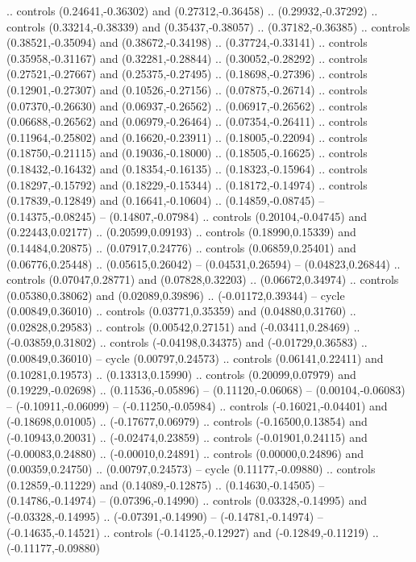 {{.. controls (0.24641,-0.36302) and (0.27312,-0.36458) .. (0.29932,-0.37292)
.. controls (0.33214,-0.38339) and (0.35437,-0.38057) .. (0.37182,-0.36385)
.. controls (0.38521,-0.35094) and (0.38672,-0.34198) .. (0.37724,-0.33141)
.. controls (0.35958,-0.31167) and (0.32281,-0.28844) .. (0.30052,-0.28292)
.. controls (0.27521,-0.27667) and (0.25375,-0.27495) .. (0.18698,-0.27396)
.. controls (0.12901,-0.27307) and (0.10526,-0.27156) .. (0.07875,-0.26714)
.. controls (0.07370,-0.26630) and (0.06937,-0.26562) .. (0.06917,-0.26562)
.. controls (0.06688,-0.26562) and (0.06979,-0.26464) .. (0.07354,-0.26411)
.. controls (0.11964,-0.25802) and (0.16620,-0.23911) .. (0.18005,-0.22094)
.. controls (0.18750,-0.21115) and (0.19036,-0.18000) .. (0.18505,-0.16625)
.. controls (0.18432,-0.16432) and (0.18354,-0.16135) .. (0.18323,-0.15964)
.. controls (0.18297,-0.15792) and (0.18229,-0.15344) .. (0.18172,-0.14974)
.. controls (0.17839,-0.12849) and (0.16641,-0.10604) .. (0.14859,-0.08745)
-- (0.14375,-0.08245)
-- (0.14807,-0.07984)
.. controls (0.20104,-0.04745) and (0.22443,0.02177) .. (0.20599,0.09193)
.. controls (0.18990,0.15339) and (0.14484,0.20875) .. (0.07917,0.24776)
.. controls (0.06859,0.25401) and (0.06776,0.25448) .. (0.05615,0.26042)
-- (0.04531,0.26594)
-- (0.04823,0.26844)
.. controls (0.07047,0.28771) and (0.07828,0.32203) .. (0.06672,0.34974)
.. controls (0.05380,0.38062) and (0.02089,0.39896) .. (-0.01172,0.39344)
-- cycle
(0.00849,0.36010)
.. controls (0.03771,0.35359) and (0.04880,0.31760) .. (0.02828,0.29583)
.. controls (0.00542,0.27151) and (-0.03411,0.28469) .. (-0.03859,0.31802)
.. controls (-0.04198,0.34375) and (-0.01729,0.36583) .. (0.00849,0.36010)
-- cycle
(0.00797,0.24573)
.. controls (0.06141,0.22411) and (0.10281,0.19573) .. (0.13313,0.15990)
.. controls (0.20099,0.07979) and (0.19229,-0.02698) .. (0.11536,-0.05896)
-- (0.11120,-0.06068)
-- (0.00104,-0.06083)
-- (-0.10911,-0.06099)
-- (-0.11250,-0.05984)
.. controls (-0.16021,-0.04401) and (-0.18698,0.01005) .. (-0.17677,0.06979)
.. controls (-0.16500,0.13854) and (-0.10943,0.20031) .. (-0.02474,0.23859)
.. controls (-0.01901,0.24115) and (-0.00083,0.24880) .. (-0.00010,0.24891)
.. controls (0.00000,0.24896) and (0.00359,0.24750) .. (0.00797,0.24573)
-- cycle
(0.11177,-0.09880)
.. controls (0.12859,-0.11229) and (0.14089,-0.12875) .. (0.14630,-0.14505)
-- (0.14786,-0.14974)
-- (0.07396,-0.14990)
.. controls (0.03328,-0.14995) and (-0.03328,-0.14995) .. (-0.07391,-0.14990)
-- (-0.14781,-0.14974)
-- (-0.14635,-0.14521)
.. controls (-0.14125,-0.12927) and (-0.12849,-0.11219) .. (-0.11177,-0.09880)
}}
